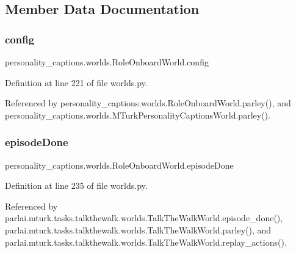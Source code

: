 \subsection{Member Data Documentation}
\mbox{\label{classpersonality__captions_1_1worlds_1_1RoleOnboardWorld_ade4545af6ba49e704c8df5d223c330f0}} 
\subsubsection{\texorpdfstring{config}{config}}
{\footnotesize\ttfamily personality\+\_\+captions.\+worlds.\+Role\+Onboard\+World.\+config}



Definition at line 221 of file worlds.\+py.



Referenced by personality\+\_\+captions.\+worlds.\+Role\+Onboard\+World.\+parley(), and personality\+\_\+captions.\+worlds.\+M\+Turk\+Personality\+Captions\+World.\+parley().

\mbox{\label{classpersonality__captions_1_1worlds_1_1RoleOnboardWorld_a6f13341d6fc898dc7701a7e99133b885}} 
\subsubsection{\texorpdfstring{episode\+Done}{episodeDone}}
{\footnotesize\ttfamily personality\+\_\+captions.\+worlds.\+Role\+Onboard\+World.\+episode\+Done}



Definition at line 235 of file worlds.\+py.



Referenced by parlai.\+mturk.\+tasks.\+talkthewalk.\+worlds.\+Talk\+The\+Walk\+World.\+episode\+\_\+done(), parlai.\+mturk.\+tasks.\+talkthewalk.\+worlds.\+Talk\+The\+Walk\+World.\+parley(), and parlai.\+mturk.\+tasks.\+talkthewalk.\+worlds.\+Talk\+The\+Walk\+World.\+replay\+\_\+actions().

